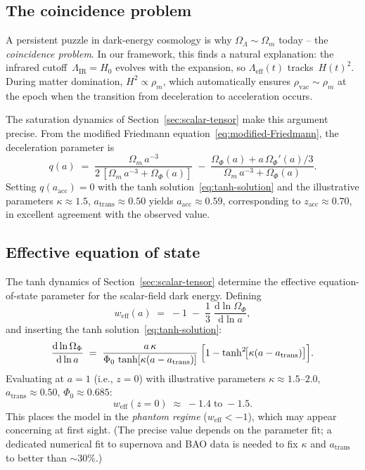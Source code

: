 \documentclass[12pt,a4paper]{article}
\theoremstyle{definition}
\theoremstyle{plain}
\theoremstyle{remark}
\newcommand{\Leff}{\Lambda_{\mathrm{eff}}}
\newcommand{\LIR}{\Lambda_{\mathrm{IR}}}
\newcommand{\dd}{\mathrm{d}}
\begin{document}
\subsection{The coincidence problem}

A persistent puzzle in dark-energy cosmology is why
$\Omega_{\Lambda} \sim \Omega_{m}$ today -- the \emph{coincidence
problem}. In our framework, this finds a natural explanation:
the infrared cutoff~$\LIR = H_0$ evolves with the expansion, so
$\Leff(t)$ tracks~$H(t)^{2}$. During matter domination,
$H^{2} \propto \rho_{m}$, which automatically ensures
$\rho_{\mathrm{vac}} \sim \rho_{m}$ at the epoch when the transition
from deceleration to acceleration occurs.

The saturation dynamics of Section~\ref{sec:scalar-tensor} make this
argument precise. From the modified Friedmann
equation~\eqref{eq:modified-Friedmann}, the deceleration parameter is
\begin{equation}
  q(a) \;=\; \frac{\Omega_{m}\,a^{-3}}{2\,[\Omega_{m}\,a^{-3}
  + \Omega_{\Phi}(a)]}
  \;-\; \frac{\Omega_{\Phi}(a) + a\,\Omega_{\Phi}'(a)/3}
       {\Omega_{m}\,a^{-3} + \Omega_{\Phi}(a)}.
\end{equation}
Setting $q(a_{\mathrm{acc}}) = 0$ with the tanh
solution~\eqref{eq:tanh-solution} and the illustrative parameters
$\kappa \approx 1.5$, $a_{\mathrm{trans}} \approx 0.50$ yields
$a_{\mathrm{acc}} \approx 0.59$, corresponding to
$z_{\mathrm{acc}} \approx 0.70$, in excellent agreement with the
observed value.

\subsection{Effective equation of state}\label{sec:weff}

The tanh dynamics of Section~\ref{sec:scalar-tensor} determine the
effective equation-of-state parameter for the scalar-field dark
energy. Defining
\begin{equation}\label{eq:weff}
  w_{\mathrm{eff}}(a)
  \;=\; -1 \;-\; \frac{1}{3}\;
  \frac{\dd\ln\Omega_{\Phi}}{\dd\ln a},
\end{equation}
and inserting the tanh solution~\eqref{eq:tanh-solution}:
\begin{equation}
  \frac{\dd\ln\Omega_{\Phi}}{\dd\ln a}
  \;=\; \frac{a\,\kappa}
       {\Phi_{0}\,\tanh[\kappa(a - a_{\mathrm{trans}})]}\;
  \Bigl[1 - \tanh^{2}\!\bigl[\kappa(a - a_{\mathrm{trans}})\bigr]
  \Bigr].
\end{equation}
Evaluating at $a = 1$ (i.e., $z = 0$) with illustrative parameters
$\kappa \approx 1.5$--$2.0$, $a_{\mathrm{trans}} \approx 0.50$,
$\Phi_{0} \approx 0.685$:
\begin{equation}\label{eq:w0-prediction}
  w_{\mathrm{eff}}(z=0) \;\approx\; -1.4 \;\text{to}\; -1.5.
\end{equation}
This places the model in the \emph{phantom regime}
($w_{\mathrm{eff}} < -1$), which may appear concerning at first sight.
(The precise value depends on the parameter fit; a dedicated
numerical fit to supernova and BAO data is needed to fix $\kappa$
and $a_{\mathrm{trans}}$ to better than $\sim 30\%$.)
\end{document}
